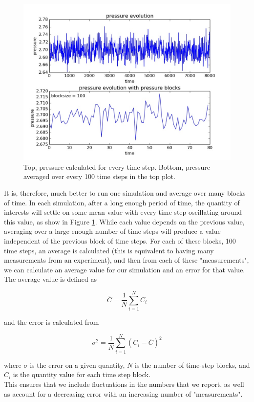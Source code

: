 \documentclass{article}
\begin{document}
\begin{multicols}{2}
\begin{figure}[H]
\begin{center}
\includegraphics[width=\linewidth]{plots/presn100lp10000T1rho088prt864.pdf}
\caption{Top, pressure calculated for every time step.  Bottom, pressure averaged over every 100 time steps in the top plot.  }
\label{errex}
\end{center}
\end{figure}

It is, therefore, much better to run one simulation and average over many blocks of time.  In each simulation, after a long enough period of time, the quantity of interests will settle on some mean value with every time step oscillating around this value, as show in Figure \ref{errex}.  While each value depends on the previous value, averaging over a large enough number of time steps will produce a value independent of the previous block of time steps.  For each of these blocks, 100 time steps, an average is calculated (this is equivalent to having many measurements from an experiment), and then from each of these "measurements", we can calculate an average value for our simulation and an error for that value.  The average value is defined as 

\begin{equation}
\bar{C} = \frac{1}{N}\sum \limits _{i=1}^N C_i 
\end{equation}

\noindent and the error is calculated from 

\begin{equation}
\sigma ^2 = \frac{1}{N}\sum \limits _{i=1}^N (C_i - \bar{C})^2
\end{equation}

\noindent where $\sigma$ is the error on a given quantity, $N$ is the number of time-step blocks, and $C_i$ is the quantity value for each time step block.\\

This ensures that we include fluctuations in the numbers that we report, as well as account for a decreasing error with an increasing number of "measurements".  

\end{multicols}
\end{document}
